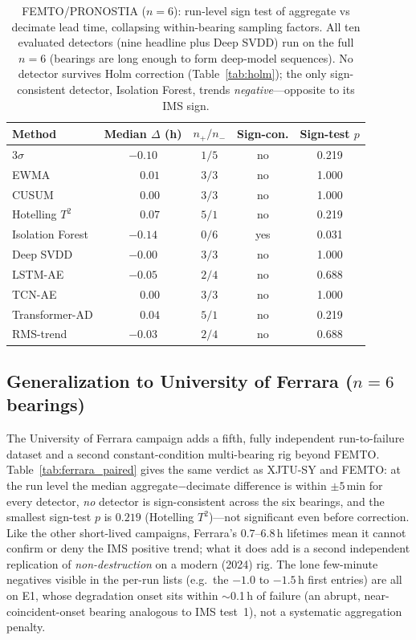 \documentclass[journal]{IEEEtran}
\begin{document}
\begin{table}[t]
\caption{FEMTO/PRONOSTIA ($n{=}6$): run-level sign test of aggregate vs decimate
lead time, collapsing within-bearing sampling factors. All ten evaluated detectors (nine
headline plus Deep SVDD) run on the full $n{=}6$ (bearings are long enough to form deep-model sequences). No
detector survives Holm correction (Table~\ref{tab:holm}); the only
sign-consistent detector, Isolation Forest, trends \emph{negative}---opposite to
its IMS sign.}
\label{tab:femto_paired}
\centering
\footnotesize
\setlength{\tabcolsep}{3.5pt}
\begin{tabular}{@{}lcccc@{}}
\toprule
Method & Median $\Delta$ (h) & $n_{+}/n_{-}$ & Sign-con. & Sign-test $p$ \\
\midrule
3$\sigma$        & $-0.10$           & $1/5$ & no  & 0.219 \\
EWMA             & $\phantom{-}0.01$ & $3/3$ & no  & 1.000 \\
CUSUM            & $\phantom{-}0.00$ & $3/3$ & no  & 1.000 \\
Hotelling $T^2$  & $\phantom{-}0.07$ & $5/1$ & no  & 0.219 \\
Isolation Forest & $-0.14$           & $0/6$ & yes & 0.031 \\
Deep SVDD        & $-0.00$           & $3/3$ & no  & 1.000 \\
LSTM-AE          & $-0.05$           & $2/4$ & no  & 0.688 \\
TCN-AE           & $\phantom{-}0.00$ & $3/3$ & no  & 1.000 \\
Transformer-AD   & $\phantom{-}0.04$ & $5/1$ & no  & 0.219 \\
RMS-trend        & $-0.03$           & $2/4$ & no  & 0.688 \\
\bottomrule
\end{tabular}
\end{table}

\subsection{Generalization to University of Ferrara ($n{=}6$ bearings)}
\label{sec:ferrara}
The University of Ferrara campaign \cite{arpa2024} adds a fifth, fully independent
run-to-failure dataset and a second constant-condition multi-bearing rig beyond FEMTO.
Table~\ref{tab:ferrara_paired} gives the same verdict as XJTU-SY and FEMTO: at the run
level the median aggregate$-$decimate difference is within $\pm5$\,min for every
detector, \emph{no} detector is sign-consistent across the six bearings, and the
smallest sign-test $p$ is $0.219$ (Hotelling $T^2$)---not significant even before
correction. Like the other short-lived campaigns, Ferrara's $0.7$--$6.8$\,h lifetimes
mean it cannot confirm or deny the IMS positive trend; what it does add is a second
independent replication of \emph{non-destruction} on a modern (2024) rig. The lone
few-minute negatives visible in the per-run lists (e.g.\ the $-1.0$ to $-1.5$\,h first
entries) are all on E1, whose degradation onset sits within $\sim$0.1\,h of failure
(an abrupt, near-coincident-onset bearing analogous to IMS test~1), not a systematic
aggregation penalty.
\end{document}
